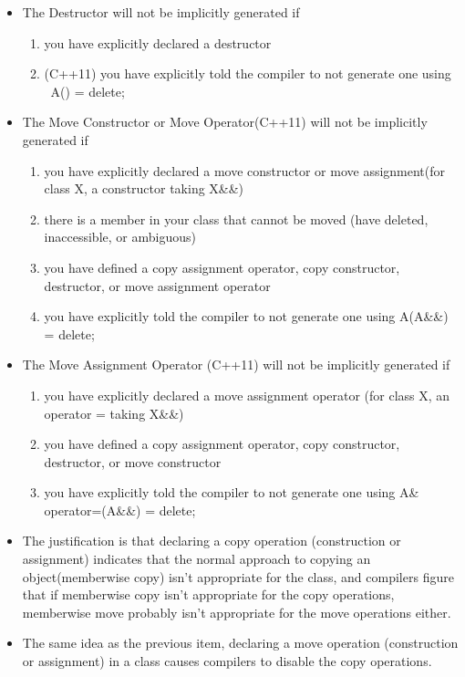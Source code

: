\documentclass[a4paper,11pt,twoside]{book}
\begin{document}
\begin{itemize}
\item The Destructor will not be implicitly generated if
\begin{enumerate}
\item you have explicitly declared a destructor
\item (C++11) you have explicitly told the compiler to not generate one using ~A() = delete;
\end{enumerate}

\item The Move Constructor or Move Operator(C++11) will not be implicitly generated if
\begin{enumerate}
\item you have explicitly declared a move constructor or move assignment(for class X, a constructor taking X\&\&)
\item there is a member in your class that cannot be moved (have deleted, inaccessible, or ambiguous)
\item you have defined a copy assignment operator, copy constructor, destructor, or move assignment operator
\item you have explicitly told the compiler to not generate one using A(A\&\&) = delete;
\end{enumerate}


\item The Move Assignment Operator (C++11) will not be implicitly generated if
\begin{enumerate}
\item you have explicitly declared a move assignment operator (for class X, an operator = taking X\&\&)
\item you have defined a copy assignment operator, copy constructor, destructor, or move constructor
\item you have explicitly told the compiler to not generate one using A\& operator=(A\&\&) = delete;
\end{enumerate}

\item  The justification is that declaring a copy operation (construction or assignment) indicates that the normal approach to copying an object(memberwise copy) isn't appropriate for the class, and compilers figure that if memberwise copy isn't appropriate for the copy operations, memberwise move probably isn't appropriate for the move operations either.

\item The same idea as the previous item, declaring a move operation (construction or assignment) in a class causes compilers to disable the copy operations.


\end{itemize}
\end{document}
